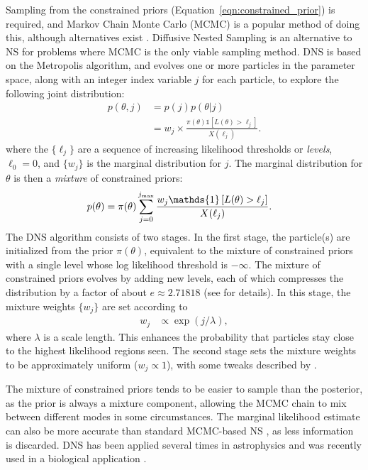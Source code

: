 \documentclass[article, nojss]{jss}
\begin{document}
Sampling from the constrained priors (Equation~\ref{eqn:constrained_prior})
is required, and Markov Chain Monte Carlo (MCMC) is a popular method of doing
this, although alternatives exist
\citep[e.g.,][]{feroz2009multinest, handley2015polychord}.
Diffusive Nested Sampling \citep[DNS;][]{brewer2011diffusive}
is an alternative to NS for
problems where MCMC is the only viable sampling method. DNS is based on the
Metropolis algorithm, and evolves one or more particles in the parameter space, along with
an integer index variable $j$ for each particle,
to explore the following joint distribution:
\begin{align}
p(\theta, j) &= p(j)p(\theta | j)\\
&= w_j \times
\frac{\pi(\theta)\mathds{1}\left[L(\theta) > \ell_j\right]}{X(\ell_j)}.
\label{eqn:target_distribution}
\end{align}
where the $\{\ell_j\}$ are a sequence of increasing likelihood thresholds
or {\em levels},
$\ell_0 = 0$, and $\{w_j\}$ is the marginal distribution for $j$.
The marginal distribution for $\theta$ is then a {\em mixture} of
constrained priors:
\begin{align}
p(\theta) &=
\pi(\theta)\sum_{j=0}^{j_{\rm max}}
\frac{w_j\mathds{1}\left[L(\theta) > \ell_j\right]}{X(\ell_j)}.
\label{eqn:mixture_of_constrained_priors}
\end{align}
The DNS algorithm consists of two stages. In the first stage,
the particle(s) are initialized from the prior $\pi(\theta)$, equivalent
to the mixture of constrained priors with a single level whose log likelihood
threshold is $-\infty$. The mixture of constrained priors evolves by adding new levels,
each of which compresses the distribution by a factor of about $e \approx 2.71818$
(see \citet{brewer2011diffusive} for details). In this stage,
the mixture weights $\{w_j\}$ are set according to
\begin{align}
w_j &\propto \exp(j/\lambda),\label{eqn:weighting}
\end{align}
where $\lambda$ is a scale length.
This enhances the probability that particles stay close to the
highest likelihood regions seen.
The second stage sets the mixture weights to be approximately
uniform ($w_j \propto 1$), with some tweaks described by
\citet{brewer2011diffusive}.

The mixture of constrained priors tends to be easier to sample than the
posterior, as the prior is always a mixture component, allowing the
MCMC chain to mix between different modes in some circumstances. The marginal
likelihood estimate can also be more accurate than standard MCMC-based NS
\citep{brewer2011diffusive}, as less information is discarded.
DNS has been applied several times in astrophysics
\citep[e.g.,][]{pancoast2014modelling, huppenkothen2015dissecting,
brewer2015fast}
and was recently used in a biological application
\citep{dybowski2015single}.
\end{document}
